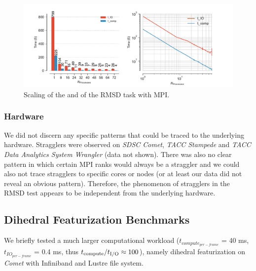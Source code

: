 \begin{figure}
\centering
  \includegraphics[width=\linewidth]{figures/main-RMSD-time_comp_IO_comparison.pdf}
\caption{Scaling of the \tcomp and \tIO of the RMSD task with MPI.}
\label{fig:ScalingComputeIO}
\end{figure}

\subsubsection*{Hardware}

We did not discern any specific patterns that could be traced to the underlying hardware. Stragglers were observed on \emph{SDSC Comet},
\emph{TACC Stampede} and \emph{TACC Data Analytics System Wrangler} (data not shown). There was also no clear pattern in which certain MPI
ranks would always be a straggler and we could also not trace stragglers to specific cores or nodes (or at least our data did not
reveal an obvious pattern). Therefore, the phenomenon of stragglers in the RMSD test appears to be independent from the underlying hardware.

\subsection{Dihedral Featurization Benchmarks}
\label{DF}
We briefly tested a much larger computational workload ($t_{compute_{per-frame}}$ = 40 ms, $t_{IO_{per-frame}}$ = 0.4 ms, thus ${t}_{\text{compute}}/{t}_{\text{I/O}} \approx 100$), namely dihedral
featurization on \emph{Comet} with Infiniband and Lustre file system.

